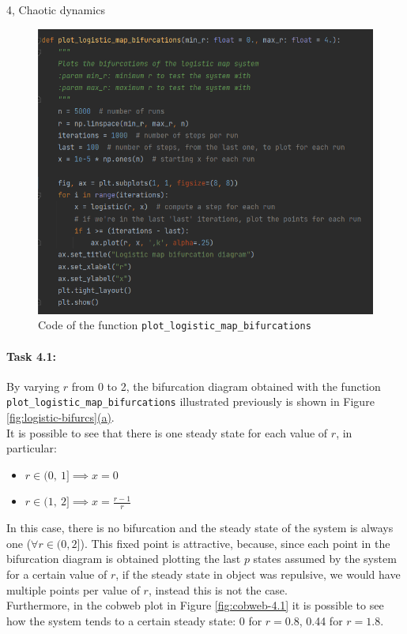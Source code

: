 \documentclass[10pt,a4paper]{article}
\begin{document}
\begin{task}{4, Chaotic dynamics}
\begin{figure}[t]
    \centering
    \includegraphics[scale=0.8]{images/code-plot_logistic_map_bifurcations.png}
    \caption{Code of the function \texttt{plot\_logistic\_map\_bifurcations}}
    \label{fig:plot-logistic-map-bifurcations}
\end{figure}

\paragraph{Task 4.1:}
By varying $r$ from 0 to 2, the bifurcation diagram obtained with the function \texttt{plot\_logistic\_map\_bifurcations} illustrated previously is shown in Figure \hyperref[fig:logistic-bifurcs]{\ref{fig:logistic-bifurcs}(a)}.\\
It is possible to see that there is one steady state for each value of $r$, in particular:
\begin{itemize}
    \item $r \in (0,\ 1] \implies x = 0$
    \item $r \in (1,\ 2] \implies x = \frac{r - 1}{r}$
\end{itemize}
In this case, there is no bifurcation and the steady state of the system is always one ($\forall r \in (0, 2]$).
This fixed point is attractive, because, since each point in the bifurcation diagram is obtained plotting the last $p$ states assumed by the system for a certain value of $r$, if the steady state in object was repulsive, we would have multiple points per value of $r$, instead this is not the case.\\
Furthermore, in the cobweb plot in Figure \ref{fig:cobweb-4.1} it is possible to see how the system tends to a certain steady state: 0 for $r = 0.8$, 0.44 for $r = 1.8$.


\end{task}
\end{document}

